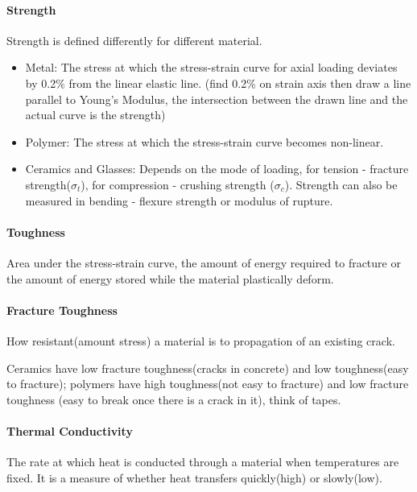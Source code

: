 \documentclass{article}
\begin{document}
    \paragraph*{Strength\newline}
    Strength is defined differently for different material.
    \begin{itemize}
        \item Metal: The stress at which the stress-strain curve for axial loading deviates by 0.2$\%$
                     from the linear elastic line. (find 0.2$\%$ on strain axis then draw a line parallel to Young's Modulus, the intersection between the drawn line and the actual curve is the strength)
        \item Polymer: The stress at which the stress-strain curve becomes non-linear.
        \item Ceramics and Glasses: Depends on the mode of loading, for tension - fracture strength($\sigma_{t}$), for compression - 
                                    crushing strength ($\sigma_{c}$). Strength can also be measured in bending - flexure strength or modulus of rupture.
    \end{itemize}


    \paragraph*{Toughness\newline}
    Area under the stress-strain curve, the amount of energy required to fracture or the amount
    of energy stored while the material plastically deform.

    \paragraph*{Fracture Toughness\newline}
    How resistant(amount stress) a material is to propagation of an existing crack.

    \noindent *Ceramics have low fracture toughness(cracks in concrete) and low toughness(easy to fracture); polymers have high toughness(not easy to fracture) and low fracture toughness
    (easy to break once there is a crack in it), think of tapes.

    \paragraph*{Thermal Conductivity\newline}
    The rate at which heat is conducted through a material when temperatures are fixed. It is a measure of whether heat transfers quickly(high) or slowly(low).
\end{document}
